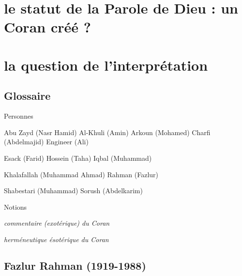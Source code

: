 \section{le statut de la Parole de Dieu : un Coran créé ?}


\section{la question de l'interprétation}





\subsection{Glossaire}

 
{Personnes}

Abu Zayd (Nasr Hamid) Al-Khuli (Amin) Arkoun (Mohamed) Charfi
(Abdelmajid) Engineer (Ali)

Esack (Farid) Hossein (Taha) Iqbal (Muhammad)

Khalafallah (Muhammad Ahmad) Rahman (Fazlur)

Shabestari (Muhammad) Sorush (Abdelkarim)

{Notions}
\begin{Def}[tafsir]
\emph{commentaire (exotérique) du Coran}
\end{Def}


\begin{Def}[ta'wil]
\emph{herméneutique ésotérique du Coran}
\end{Def}
 

\subsection{Fazlur Rahman
(1919-1988)}


